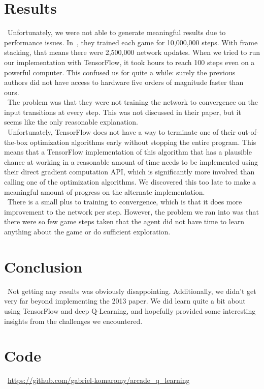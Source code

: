 \documentclass[conference]{IEEEtran}
\begin{document}
\section{Results}
\noindent\ Unfortunately, we were not able to generate meaningful results due
to performance issues. In~\cite{mnih2013playing}, they trained each game for
10,000,000 steps. With frame stacking, that means there were 2,500,000 network
updates.  When we tried to run our implementation with TensorFlow, it took
hours to reach 100 steps even on a powerful computer. This confused us for
quite a while: surely the previous authors did not have access to hardware five
orders of magnitude faster than ours.\\
\indent\ The problem was that they were not training the network to convergence
on the input transitions at every step. This was not discussed in their paper,
but it seems like the only reasonable explanation.\\
\indent\ Unfortunately, TensorFlow does not have a way to terminate one of
their out-of-the-box optimization algorithms early without stopping the entire
program. This means that a TensorFlow implementation of this algorithm that has
a plausible chance at working in a reasonable amount of time needs to be
implemented using their direct gradient computation API, which is significantly
more involved than calling one of the optimization algorithms. We discovered
this too late to make a meaningful amount of progress on the alternate
implementation.\\
\indent\ There is a small plus to training to convergence, which is that it
does more improvement to the network per step. However, the problem we ran into
was that there were so few game steps taken that the agent did not have time to
learn anything about the game or do sufficient exploration.

\section{Conclusion}
\noindent\ Not getting any results was obviously disappointing. Additionally,
we didn't get very far beyond implementing the 2013 paper. We did learn quite a
bit about using TensorFlow and deep Q-Learning, and hopefully provided some
interesting insights from the challenges we encountered.

\section{Code}
\noindent\ \url{https://github.com/gabriel-komaromy/arcade_q_learning}
\end{document}
